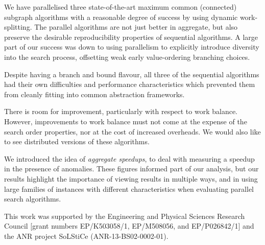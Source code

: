 \documentclass[sigconf]{acmart}
\begin{document}
We have parallelised three state-of-the-art maximum common (connected) subgraph algorithms with a
reasonable degree of success by using dynamic work-splitting. The parallel algorithms are not just
better in aggregate, but also preserve the desirable reproducibility properties of sequential
algorithms. A large part of our success was down to using parallelism to explicitly introduce
diversity into the search process, offsetting weak early value-ordering branching choices.

Despite having a branch and bound flavour, all three of the sequential algorithms had their own
difficulties and performance characteristics which prevented them from cleanly fitting into common
abstraction frameworks.

There is room for improvement, particularly with respect to work balance. However, improvements to
work balance must not come at the expense of the search order properties, nor at the cost of
increased overheads. We would also like to see distributed versions of these algorithms.

We introduced the idea of \emph{aggregate speedups}, to deal with measuring a speedup in the
presence of anomalies. These figures informed part of our analysis, but our results highlight the
importance of viewing results in multiple ways, and in using large families of instances with
different characteristics when evaluating parallel search algorithms.

\appendix
\begin{acks}
    This work was supported by the Engineering and Physical Sciences Research Council [grant
numbers EP/K503058/1, EP/M508056, and EP/P026842/1] and the ANR project SoLStiCe
(ANR-13-BS02-0002-01).
\end{acks}



\end{document}

